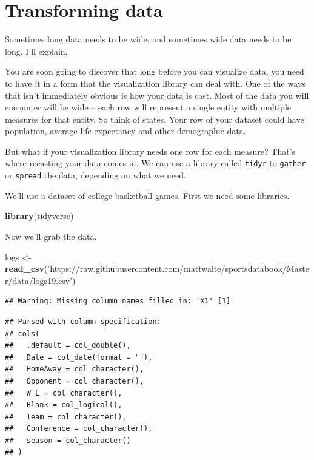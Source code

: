 \documentclass[]{book}
\newenvironment{Shaded}{\begin{snugshade}}{\end{snugshade}}
\newcommand{\KeywordTok}[1]{\textcolor[rgb]{0.13,0.29,0.53}{\textbf{#1}}}
\newcommand{\StringTok}[1]{\textcolor[rgb]{0.31,0.60,0.02}{#1}}
\newcommand{\NormalTok}[1]{#1}
\begin{document}
\chapter{Transforming data}\label{transforming-data}

Sometimes long data needs to be wide, and sometimes wide data needs to
be long. I'll explain.

You are soon going to discover that long before you can visualize data,
you need to have it in a form that the visualization library can deal
with. One of the ways that isn't immediately obvious is how your data is
cast. Most of the data you will encounter will be wide -- each row will
represent a single entity with multiple measures for that entity. So
think of states. Your row of your dataset could have population, average
life expectancy and other demographic data.

But what if your visualization library needs one row for each measure?
That's where recasting your data comes in. We can use a library called
\texttt{tidyr} to \texttt{gather} or \texttt{spread} the data, depending
on what we need.

We'll use a dataset of college basketball games. First we need some
libraries.

\begin{Shaded}
\begin{Highlighting}[]
\KeywordTok{library}\NormalTok{(tidyverse)}
\end{Highlighting}
\end{Shaded}

Now we'll grab the data.

\begin{Shaded}
\begin{Highlighting}[]
\NormalTok{logs <-}\StringTok{ }\KeywordTok{read_csv}\NormalTok{(}\StringTok{'https://raw.githubusercontent.com/mattwaite/sportsdatabook/Master/data/logs19.csv'}\NormalTok{)}
\end{Highlighting}
\end{Shaded}

\begin{verbatim}
## Warning: Missing column names filled in: 'X1' [1]
\end{verbatim}

\begin{verbatim}
## Parsed with column specification:
## cols(
##   .default = col_double(),
##   Date = col_date(format = ""),
##   HomeAway = col_character(),
##   Opponent = col_character(),
##   W_L = col_character(),
##   Blank = col_logical(),
##   Team = col_character(),
##   Conference = col_character(),
##   season = col_character()
## )
\end{verbatim}
\end{document}
